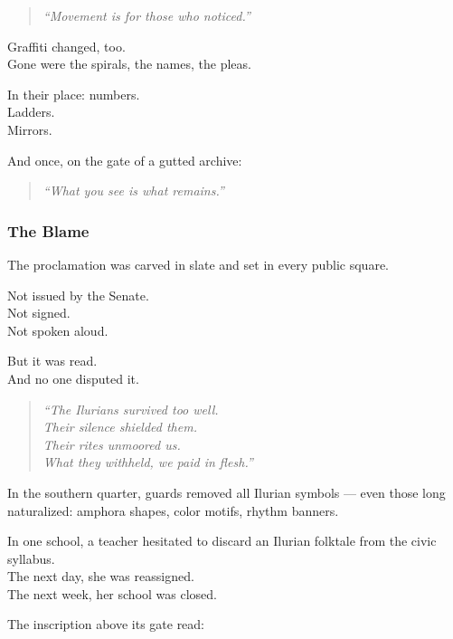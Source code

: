 \documentclass[12pt]{article}
\begin{document}
\begin{quote}
\textit{“Movement is for those who noticed.”}
\end{quote}

\vspace{1em}

Graffiti changed, too.\\
Gone were the spirals, the names, the pleas.

In their place: numbers.\\
Ladders.\\
Mirrors.

And once, on the gate of a gutted archive:

\begin{quote}
\textit{“What you see is what remains.”}
\end{quote}

\dotfill

\subsubsection{The Blame}

The proclamation was carved in slate and set in every public square.

Not issued by the Senate.\\
Not signed.\\
Not spoken aloud.

But it was read.\\
And no one disputed it.

\begin{quote}
\textit{“The Ilurians survived too well.}\\
\textit{Their silence shielded them.}\\
\textit{Their rites unmoored us.}\\
\textit{What they withheld, we paid in flesh.”}
\end{quote}

\vspace{1em}

In the southern quarter, guards removed all Ilurian symbols — even those long naturalized: amphora shapes, color motifs, rhythm banners.

In one school, a teacher hesitated to discard an Ilurian folktale from the civic syllabus.\\
The next day, she was reassigned.\\
The next week, her school was closed.

The inscription above its gate read:
\end{document}
